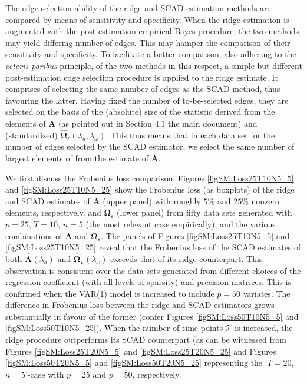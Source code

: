 The edge selection ability of the ridge and SCAD estimation methods are compared by means of sensitivity and specificity. When the ridge estimation is augmented with the post-estimation empirical Bayes procedure, the two methods may yield differing number of edges. This may hamper the comparison of their sensitivity and specificity. To facilitate a better comparison, also adhering to the \textit{ceteris paribus} principle, of the two methods in this respect, a simple but different post-estimation edge selection procedure is applied to the ridge estimate. It comprises of selecting the same number of edges as the SCAD method, thus favouring the latter. Having fixed the number of to-be-selected edges, they are selected on the basis of the (absolute) size of the statistic derived from the elements of $\mathbf{A}$ (as pointed out in Section 4.1 the main document) and (standardized) $\widehat{\mathbf{\Omega}}_{\varepsilon}(\lambda_a, \lambda_{\omega})$. This thus means that in each data set for the number of edges selected by the SCAD estimator, we select the same number of largest elements of from the estimate of $\mathbf{A}$.

We first discuss the Frobenius loss comparison. Figures \ref{figSM:Loss25T10N5_5} and \ref{figSM:Loss25T10N5_25} show the Frobenius loss (as boxplots) of the ridge and SCAD estimates of $\mathbf{A}$ (upper panel) with roughly $5\%$ and $25\%$ nonzero elements, respectively, and $\mathbf{\Omega}_{\varepsilon}$ (lower panel) from fifty data sets generated with $p=25$, $T=10$, $n=5$ (the most relevant case empirically), and the various combinations of $\mathbf{A}$ and $\mathbf{\Omega}_{\varepsilon}$. The panels of Figures \ref{figSM:Loss25T10N5_5}  and \ref{figSM:Loss25T10N5_25} reveal that the Frobenius loss of the SCAD estimates of both  $\mathbf{\hat{A}}(\lambda_a)$ and  $\mathbf{\hat{\Omega}_{\varepsilon}}(\lambda_{\omega})$ exceeds that of its ridge counterpart. This observation is consistent over the data sets generated from different choices of the regression coefficient (with all levels of sparsity) and precision matrices. This is confirmed when the VAR(1) model is increased to include $p=50$ variates. The difference in Frobenius loss between the ridge and SCAD estimators grows substantially in favour of the former (confer Figures \ref{figSM:Loss50T10N5_5} and \ref{figSM:Loss50T10N5_25}). When the number of time points $\mathcal{T}$ is increased, the ridge procedure outperforms its SCAD counterpart (as can be witnessed from Figures \ref{figSM:Loss25T20N5_5} and \ref{figSM:Loss25T20N5_25} and Figures \ref{figSM:Loss50T20N5_5} and \ref{figSM:Loss50T20N5_25} representing the `$T=20$, $n=5$'-case with $p=25$ and $p=50$, respectively. 

